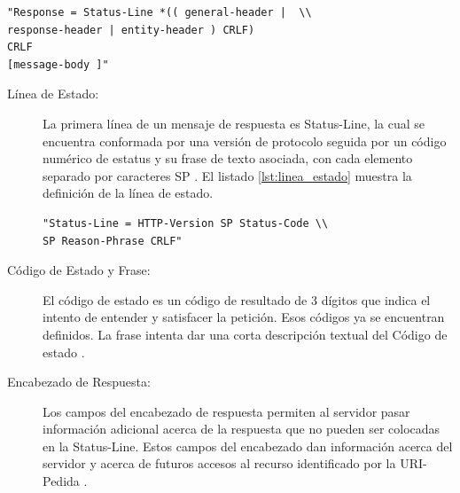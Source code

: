 \begin{lstlisting}[caption={Mensaje de respuesta HTTP},label={lst:respuesta_http}]
"Response = Status-Line *(( general-header |  \\
response-header | entity-header ) CRLF) 
CRLF 
[message-body ]"
\end{lstlisting}

\begin{description}

\item[Línea de Estado: ]
La primera línea de un mensaje de respuesta es Status-Line, la cual se encuentra conformada por una versión de protocolo seguida por un código numérico de estatus y su frase de texto asociada, con cada elemento separado por caracteres SP \cite{rfc2616}. El listado \ref{lst:linea_estado} muestra la definición de la línea de estado.

\begin{lstlisting}[caption={Línea de Estado},label={lst:linea_estado}]
"Status-Line = HTTP-Version SP Status-Code \\ 
SP Reason-Phrase CRLF"
\end{lstlisting}

\item[Código de Estado y Frase: ]
El código de estado es un código de resultado de 3 dígitos que indica el intento de entender y satisfacer la petición. Esos códigos ya se encuentran definidos. La frase intenta dar una corta descripción textual del Código de estado \cite{rfc2616}.

\item[Encabezado de Respuesta: ]
Los campos del encabezado de respuesta permiten al servidor pasar información adicional acerca de la respuesta que no pueden ser colocadas en la Status-Line. Estos campos del encabezado dan información acerca del servidor y acerca de futuros accesos al recurso identificado por la URI-Pedida \cite{rfc2616}.
\end{description}